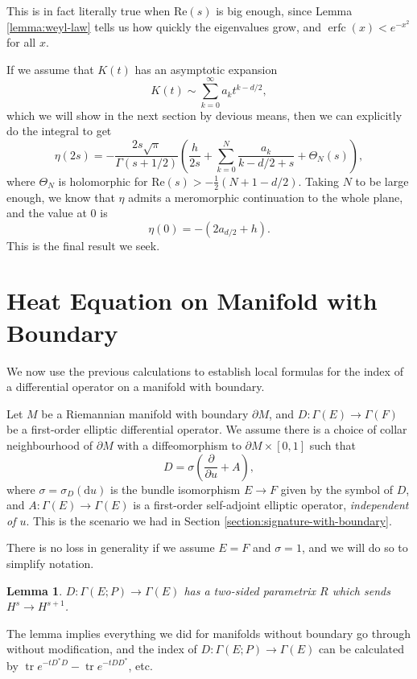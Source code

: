 \documentclass{shortart}
\newtheorem{lemma}[thm]{Lemma}
\theoremstyle{definition}
\renewcommand\d{\mathrm{d}}
\renewcommand\Re{\mathrm{Re}}
\DeclareMathOperator\tr{tr}
\DeclareMathOperator\erfc{erfc}
\begin{document}
This is in fact literally true when $\Re(s)$ is big enough, since Lemma \ref{lemma:weyl-law} tells us how quickly the eigenvalues grow, and $\erfc(x) < e^{-x^2}$ for all $x$.

If we assume that $K(t)$ has an asymptotic expansion
\[
  K(t) \sim \sum_{k = 0}^{\infty} a_k t^{k - d/2},
\]
which we will show in the next section by devious means, then we can explicitly do the integral to get
\[
  \eta(2s) = -\frac{2 s \sqrt{\pi}}{ \Gamma(s + 1/2)} \left(\frac{h}{2s} + \sum_{k = 0}^N \frac{a_k}{k - d/2 + s} + \Theta_N(s)\right),
\]
where $\Theta_N$ is holomorphic for $\Re(s) > -\frac{1}{2}(N + 1 - d/2)$. Taking $N$ to be large enough, we know that $\eta$ admits a meromorphic continuation to the whole plane, and the value at $0$ is
\[
  \eta(0) = - (2a_{d/2} + h).
\]
This is the final result we seek.

\section{Heat Equation on Manifold with Boundary}\label{section:with-boundary}
We now use the previous calculations to establish local formulas for the index of a differential operator on a manifold with boundary.

Let $M$ be a Riemannian manifold with boundary $\partial M$, and $D\colon \Gamma(E) \to \Gamma(F)$ be a first-order elliptic differential operator. We assume there is a choice of collar neighbourhood of $\partial M$ with a diffeomorphism to $\partial M \times [0, 1]$ such that  
\[
  D = \sigma \left(\frac{\partial}{\partial u} + A\right),
\]
where $\sigma = \sigma_D(\d u)$ is the bundle isomorphism $E \to F$ given by the symbol of $D$, and $A\colon \Gamma(E) \to \Gamma(E)$ is a first-order self-adjoint elliptic operator, \emph{independent of $u$}. This is the scenario we had in Section \ref{section:signature-with-boundary}.

There is no loss in generality if we assume $E = F$ and $\sigma = 1$, and we will do so to simplify notation.

\begin{lemma}
  $D: \Gamma(E; P) \to \Gamma(E)$ has a two-sided parametrix $R$ which sends $H^s \to H^{s + 1}$.
\end{lemma}
The lemma implies everything we did for manifolds without boundary go through without modification, and the index of $D: \Gamma(E; P) \to \Gamma(E)$ can be calculated by $\tr e^{-t D^*D} - \tr e^{-t DD^*}$, etc.
\end{document}
